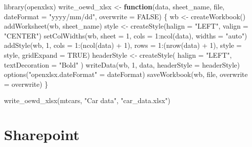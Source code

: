 \documentclass[
  letterpaper,
  DIV=11,
  numbers=noendperiod]{scrreprt}
\newenvironment{Shaded}{\begin{snugshade}}{\end{snugshade}}
\newcommand{\AttributeTok}[1]{\textcolor[rgb]{0.40,0.45,0.13}{#1}}
\newcommand{\ConstantTok}[1]{\textcolor[rgb]{0.56,0.35,0.01}{#1}}
\newcommand{\ControlFlowTok}[1]{\textcolor[rgb]{0.00,0.23,0.31}{\textbf{#1}}}
\newcommand{\DecValTok}[1]{\textcolor[rgb]{0.68,0.00,0.00}{#1}}
\newcommand{\FunctionTok}[1]{\textcolor[rgb]{0.28,0.35,0.67}{#1}}
\newcommand{\NormalTok}[1]{\textcolor[rgb]{0.00,0.23,0.31}{#1}}
\newcommand{\OtherTok}[1]{\textcolor[rgb]{0.00,0.23,0.31}{#1}}
\newcommand{\SpecialCharTok}[1]{\textcolor[rgb]{0.37,0.37,0.37}{#1}}
\newcommand{\StringTok}[1]{\textcolor[rgb]{0.13,0.47,0.30}{#1}}
\begin{document}
\begin{Shaded}
\begin{Highlighting}[]
\FunctionTok{library}\NormalTok{(openxlsx)}
\NormalTok{write\_oewd\_xlsx }\OtherTok{\textless{}{-}} \ControlFlowTok{function}\NormalTok{(data, sheet\_name, file, }\AttributeTok{dateFormat =} \StringTok{"yyyy/mm/dd"}\NormalTok{, }\AttributeTok{overwrite =} \ConstantTok{FALSE}\NormalTok{) \{}
\NormalTok{  wb }\OtherTok{\textless{}{-}} \FunctionTok{createWorkbook}\NormalTok{()}
  \FunctionTok{addWorksheet}\NormalTok{(wb, sheet\_name)}
\NormalTok{  style }\OtherTok{\textless{}{-}} \FunctionTok{createStyle}\NormalTok{(}\AttributeTok{halign =} \StringTok{"LEFT"}\NormalTok{, }\AttributeTok{valign =} \StringTok{"CENTER"}\NormalTok{)}
  \FunctionTok{setColWidths}\NormalTok{(wb, }\AttributeTok{sheet =} \DecValTok{1}\NormalTok{, }\AttributeTok{cols =} \DecValTok{1}\SpecialCharTok{:}\FunctionTok{ncol}\NormalTok{(data), }\AttributeTok{widths =} \StringTok{"auto"}\NormalTok{)}
  \FunctionTok{addStyle}\NormalTok{(wb, }\DecValTok{1}\NormalTok{,}
           \AttributeTok{cols =} \DecValTok{1}\SpecialCharTok{:}\NormalTok{(}\FunctionTok{ncol}\NormalTok{(data) }\SpecialCharTok{+} \DecValTok{1}\NormalTok{),}
           \AttributeTok{rows =} \DecValTok{1}\SpecialCharTok{:}\NormalTok{(}\FunctionTok{nrow}\NormalTok{(data) }\SpecialCharTok{+} \DecValTok{1}\NormalTok{),}
           \AttributeTok{style =}\NormalTok{ style,}
           \AttributeTok{gridExpand =} \ConstantTok{TRUE}\NormalTok{)}
\NormalTok{  headerStyle }\OtherTok{\textless{}{-}} \FunctionTok{createStyle}\NormalTok{(}
    \AttributeTok{halign =} \StringTok{"LEFT"}\NormalTok{,}
    \AttributeTok{textDecoration =} \StringTok{"Bold"}
\NormalTok{  )}
  \FunctionTok{writeData}\NormalTok{(wb, }\DecValTok{1}\NormalTok{, data, }\AttributeTok{headerStyle =}\NormalTok{ headerStyle)}
  \FunctionTok{options}\NormalTok{(}\StringTok{"openxlsx.dateFormat"} \OtherTok{=}\NormalTok{ dateFormat)}
  \FunctionTok{saveWorkbook}\NormalTok{(wb, file, }\AttributeTok{overwrite =}\NormalTok{ overwrite)}
\NormalTok{\}}

\FunctionTok{write\_oewd\_xlsx}\NormalTok{(mtcars, }\StringTok{"Car data"}\NormalTok{, }\StringTok{"car\_data.xlsx"}\NormalTok{)}
\end{Highlighting}
\end{Shaded}


\chapter{Sharepoint}\label{sharepoint}
\end{document}

